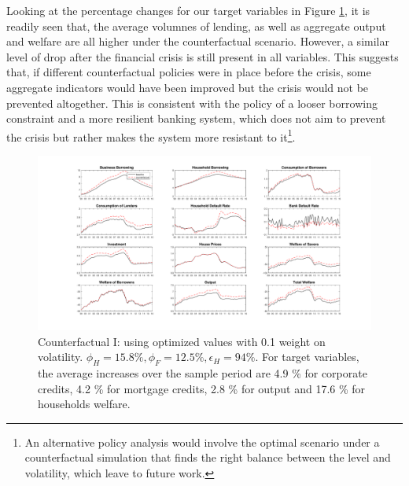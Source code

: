 \documentclass[12pt]{article}
\numberwithin{equation}{section}
\begin{document}
Looking at the percentage changes for our target variables in Figure \ref{counterfactual1}, it is readily seen that, the average volumnes of lending, as well as aggregate output and welfare are all higher under the counterfactual scenario. However, a similar level of drop after the financial crisis is still present in all variables. This suggests that, if different counterfactual policies were in place before the crisis, some aggregate indicators would have been improved but the crisis would not be prevented altogether. This is consistent with the policy of a looser borrowing constraint and a more resilient banking system, which does not aim to prevent the crisis but rather makes the system more resistant to it\footnote{An alternative policy analysis would involve the optimal scenario under a counterfactual simulation that finds the right balance between the level and volatility, which leave to future work.}. 



\begin{figure}[H]{}
\centering
\caption{Counterfactual I: using optimized values  with 0.1 weight on volatility. $\phi_H=15.8 \%, \phi_F=12.5 \%, \epsilon_H=94 \%$. For target variables, the average increases over the sample period are 4.9 \% for corporate credits, 4.2 \% for mortgage credits, 2.8 \% for output and 17.6 \% for households welfare.   }
\label{counterfactual1}
\includegraphics[scale=0.4]{main_counterfactual.pdf}
\end{figure}


\end{document}

